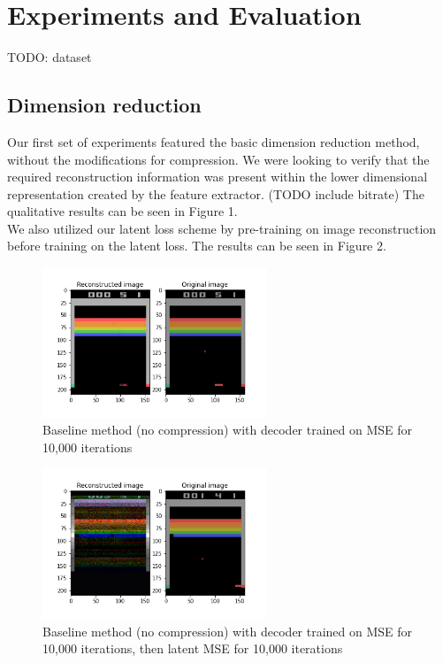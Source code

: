 \section{Experiments and Evaluation}
TODO: dataset
\subsection{Dimension reduction}
Our first set of experiments featured the basic dimension reduction method, without the modifications for compression. We were looking to verify that the required reconstruction information was present within the lower dimensional representation created by the feature extractor. (TODO include bitrate) The qualitative results can be seen in Figure 1. \\
We also utilized our latent loss scheme by pre-training on image reconstruction before training on the latent loss. The results can be seen in Figure 2.
\begin{figure}[H]
    \centering
    \includegraphics[width=0.6\textwidth]{images/orig_reconstructed0.0.png}
    \caption{Baseline method (no compression) with decoder trained on MSE for 10,000 iterations}
    \label{fig:baseline_MSE}
\end{figure}
\begin{figure}[H]
    \centering
    \includegraphics[width=0.6\textwidth]{images/orig_reconstructed_rl3.0.png}
    \caption{Baseline method (no compression) with decoder trained on MSE for 10,000 iterations, then latent MSE for 10,000 iterations}
    \label{fig:baseline_MSE_latent}
\end{figure}
